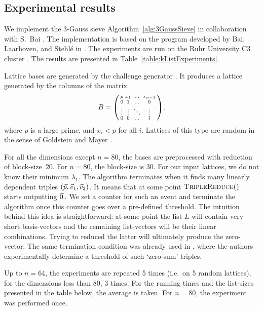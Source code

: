 \subsection{Experimental results} \label{subsec:KListResults}
We implement the $3$-Gauss sieve Algorithm~\ref{alg:3GaussSieve} in collaboration with S.\ Bai \cite{Bai16}. 
The implementation is based on the program developed by Bai, Laarhoven, and Stehl\'{e} in \cite{BLS16}. 
The experiments are run on the Ruhr University C3 cluster \cite{C3}. The results are presented in Table~\ref{table:kListExperiments}.

Lattice bases are generated by the \SVP challenge generator \cite{SVPChallenge}. It produces a lattice generated by the columns of the matrix
\begin{align*} B=
\begin{psmallmatrix}
	p & x_1 & \ldots & x_{n-1} \\
	0 & 1 & \ldots &  0  \\
	\vdots & \vdots & \ddots & \vdots \\
	0 & 0 & \ldots & 1 \\
\end{psmallmatrix},
\end{align*}
where $p$ is a large prime, and $x_i< p$ for all $i$. Lattices of this type are random in the sense of Goldstein and Mayer \cite{GoldMay06}.

For all the dimensions except $n=80$, the bases are preprocessed with \BKZ reduction of block-size~$20$. For $n=80$, the block-size is $30$. For our input lattices, we do not know their minimum $\lambda_1$. The algorithm terminates when it finds many linearly dependent triples $(\pvec, \vvec_1, \vvec_2)$. It means that at some point $\Call{TripleReduce}$ starts outputting $\zerovec$. We set a counter for such an event and terminate the algorithm once this counter goes over a pre-defined threshold. The intuition behind this idea is straightforward: at some point the list $L$ will contain very short basis-vectors and the remaining list-vectors will be their linear combinations. Trying to reduced the latter will ultimately produce the zero-vector. The same termination condition was already used in \cite{BLM15}, where the authors experimentally determine a threshold of such `zero-sum' triples.

Up to $n=64$, the experiments are repeated 5 times (i.e.\ on 5 random lattices), for the dimensions less than $80$, 3 times. For the running times and the list-sizes presented in the table below, the average is taken. For $n=80$, the experiment was performed once.  

